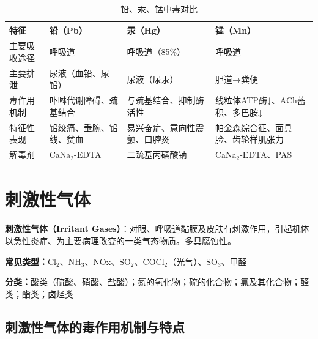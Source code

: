 \begin{table}[H]
\centering
\caption{铅、汞、锰中毒对比}
\begin{tabularx}{\textwidth}{lXXX}
\hline
\textbf{特征} & \textbf{铅（Pb）} & \textbf{汞（Hg）} & \textbf{锰（Mn）} \\
\hline
主要吸收途径 & 呼吸道 & 呼吸道（85\%） & 呼吸道 \\
主要排泄 & 尿液（血铅、尿铅） & 尿液（尿汞） & 胆道→粪便 \\
毒作用机制 & 卟啉代谢障碍、巯基结合 & 与巯基结合、抑制酶活性 & 线粒体ATP酶↓、ACh蓄积、多巴胺↓ \\
特征性表现 & 铅绞痛、垂腕、铅线、贫血 & 易兴奋症、意向性震颤、口腔炎 & 帕金森综合征、面具脸、齿轮样肌张力 \\
解毒剂 & CaNa$_2$-EDTA & 二巯基丙磺酸钠 & CaNa$_2$-EDTA、PAS \\
\hline
\end{tabularx}
\end{table}

\section{刺激性气体}

\begin{defbox}
\textbf{刺激性气体（Irritant Gases）}：对眼、呼吸道黏膜及皮肤有刺激作用，引起机体以急性炎症、为主要病理改变的一类气态物质。多具腐蚀性。

\textbf{常见类型：}Cl$_2$、NH$_3$、NOx、SO$_2$、COCl$_2$（光气）、SO$_3$、甲醛

\textbf{分类：}酸类（硫酸、硝酸、盐酸）；氮的氧化物；硫的化合物；氯及其化合物；醛类；酯类；卤烃类
\end{defbox}

\subsection{刺激性气体的毒作用机制与特点}

